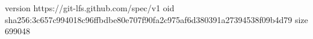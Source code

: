 version https://git-lfs.github.com/spec/v1
oid sha256:3c657c994018c96ffbdbe80e707f90fa2c975af6d380391a27394538f09b4d79
size 699048
